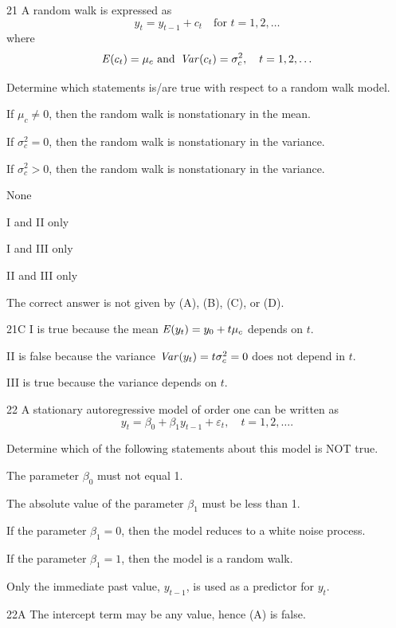 \begin{question}{21}
A random walk is expressed as
\[ y_t = y_{t-1} + c_t \quad \text{for } t = 1, 2, \ldots \]
where
\[ \operatorname{\mathit{E}}(c_t) = \mu_c \text{ and } \operatorname{\mathit{Var}}(c_t) = \sigma_c^2, \quad t = 1, 2, \ldots \]

Determine which statements is/are true with respect to a random walk model.
\begin{statements}
\item If $\mu_c \neq 0$, then the random walk is nonstationary in the mean.
\item If $\sigma_c^2 = 0$, then the random walk is nonstationary in the variance.
\item If $\sigma_c^2 > 0$, then the random walk is nonstationary in the variance.
\end{statements}

\begin{choices}
\item None
\item I and II only
\item I and III only
\item II and III only
\item The correct answer is not given by (A), (B), (C), or (D).
\end{choices}
\end{question}
\begin{solution}{21}{C}
I is true because the mean $\operatorname{\mathit{E}}(y_t) = y_0 + t\mu_c$ depends on $t$.

II is false because the variance $\operatorname{\mathit{Var}}(y_t) = t\sigma_c^2 = 0$ does not depend in $t$.

III is true because the variance depends on $t$.
\end{solution}

\begin{question}{22}
A stationary autoregressive model of order one can be written as
\[ y_t = \beta_0 + \beta_1 y_{t-1} + \varepsilon_t, \quad t = 1, 2, \ldots. \]

Determine which of the following statements about this model is NOT true.

\begin{choices}
\item The parameter $\beta_0$ must not equal 1.
\item The absolute value of the parameter $\beta_1$ must be less than 1.
\item If the parameter $\beta_1 = 0$, then the model reduces to a white noise process.
\item If the parameter $\beta_1 = 1$, then the model is a random walk.
\item Only the immediate past value, $y_{t-1}$, is used as a predictor for $y_t$.
\end{choices}
\end{question}
\begin{solution}{22}{A}
The intercept term may be any value, hence (A) is false.
\end{solution}


